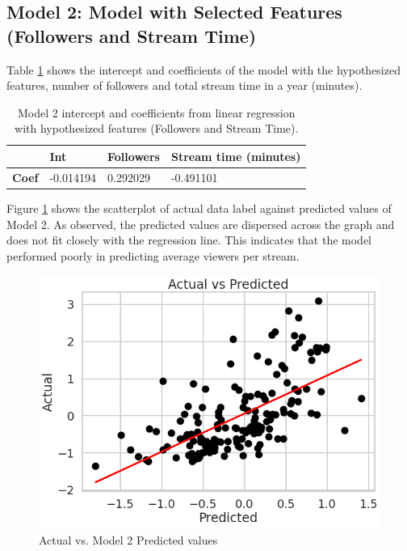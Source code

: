\documentclass[runningheads]{llncs}
\begin{document}
\subsection{Model 2: Model with Selected Features (Followers and Stream Time)}

Table \ref{tab:model2} shows the intercept and coefficients of the model with the hypothesized features, number of followers and total stream time in a year (minutes). \\

\begingroup
\setlength{\tabcolsep}{8pt} %
\renewcommand{\arraystretch}{1.2} %
\begin{table}[h]
    \centering
    \caption{Model 2 intercept and coefficients from linear regression with hypothesized features (Followers and Stream Time).}
    \begin{tabular}{|p{.10\linewidth}|p{.14\linewidth}|p{.20\linewidth}|p{.35\linewidth}|}
        \hline
      & \textbf{Int} & \textbf{Followers} & \textbf{Stream time (minutes)} \\
     \hline
     \textbf{Coef} & -0.014194 & 0.292029 & -0.491101	\\
     \hline
    \end{tabular}
    \label{tab:model2}
\end{table}
\endgroup 

Figure \ref{fig:model2} shows the scatterplot of actual data label against predicted values of Model 2. As  observed, the predicted values are dispersed across the graph and does not fit closely with the regression line. This indicates that the model performed poorly in predicting average viewers per stream.\\

\begin{figure} [h]
    \centering
    \includegraphics[width=0.6\linewidth]{figures/graphs/model_2_graph.png}
    \caption{Actual vs. Model 2 Predicted values }
  \label{fig:model2}
\end{figure}
\end{document}
